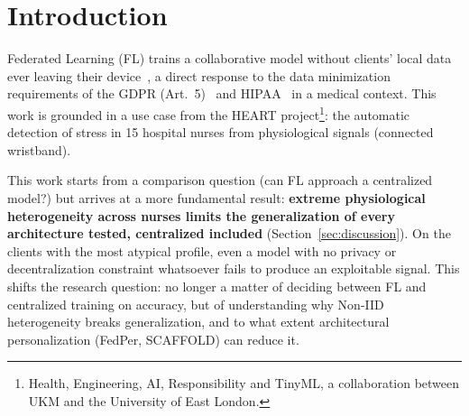 \documentclass{acmart}
\begin{document}
\begin{abstract}
{\bf Conclusions:}
The central result of this work is not that FL is costly compared to the centralized
model, but that \textbf{extreme heterogeneity across nurses limits the generalization
of every architecture tested}, centralized included: on the clients with the most
atypical physiological profile, even a model trained with no privacy or
decentralization constraint whatsoever fails to produce an exploitable signal. FL adds
only a marginal, but real and measurable, disadvantage on top of this underlying
problem. This reframes the research question: it is not about deciding between FL and
centralized training on accuracy (the centralized approach remaining legally
unsuitable for this type of health data under the GDPR regardless, which makes FL the
only viable approach in practice), but about understanding why extreme Non-IID
heterogeneity breaks generalization, and how architectural personalization (FedPer,
SCAFFOLD) can reduce it. Our results honestly quantify this residual cost, show that
it remains stable regardless of the targeted privacy level, and that it can be
significantly mitigated by a personalized architecture, all while keeping a model
deployable on a microcontroller (5.32~KB).
\end{abstract}


\maketitle

\section{Introduction}

Federated Learning (FL) trains a collaborative model without clients' local data ever
leaving their device~\cite{mcmahan2017communication}, a direct response to the data
minimization requirements of the GDPR (Art.~5)~\cite{gdpr2016} and HIPAA~\cite{hipaa1996}
in a medical context. This work is grounded in a use case from the HEART
project\footnote{Health, Engineering, AI, Responsibility and TinyML, a collaboration
between UKM and the University of East London.}: the automatic detection of stress in
15 hospital nurses from physiological signals (connected wristband).

This work starts from a comparison question (can FL approach a centralized model?) but
arrives at a more fundamental result: \textbf{extreme physiological heterogeneity
across nurses limits the generalization of every architecture tested, centralized
included} (Section~\ref{sec:discussion}). On the clients with the most atypical
profile, even a model with no privacy or decentralization constraint whatsoever fails
to produce an exploitable signal. This shifts the research question: no longer a
matter of deciding between FL and centralized training on accuracy, but of
understanding why Non-IID heterogeneity breaks generalization, and to what extent
architectural personalization (FedPer, SCAFFOLD) can reduce it.
\end{document}
